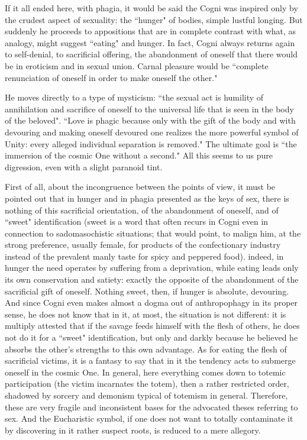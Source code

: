If it all ended here, with phagia, it would be said the Cogni was inspired only by the crudest aspect of sexuality: the
``hunger" of bodies, simple lustful longing. But suddenly he proceeds to appositions that are in complete contrast with
what, as analogy, might suggest ``eating" and hunger. In fact, Cogni always returns again to self-denial, to sacrificial
offering, the abandonment of oneself that there would be in eroticism and in sexual union. Carnal pleasure would be
``complete renunciation of oneself in order to make oneself the other."

He moves directly to a type of mysticism: ``the sexual act is humility of annihilation and sacrifice of oneself to the
universal life that is seen in the body of the beloved". ``Love is phagic because only with the gift of the body and
with devouring and making oneself devoured one realizes the more powerful symbol of Unity: every alleged individual
separation is removed." The ultimate goal is ``the immersion of the cosmic One without a second." All this seems to us
pure digression, even with a slight paranoid tint.

First of all, about the incongruence between the points of view, it must be pointed out that in hunger and in phagia
presented as the keys of sex, there is nothing of this sacrificial orientation, of the abandonment of oneself, and of
``sweet" identification (sweet is a word that often recurs in Cogni even in connection to sadomasochistic situations;
that would point, to malign him, at the strong preference, usually female, for products of the confectionary industry
instead of the prevalent manly taste for spicy and peppered food). indeed, in hunger the need operates by suffering
from a deprivation, while eating leads only its own conservation and satiety: exactly the opposite of the abandonment
of the sacrificial gift of oneself. Nothing sweet, then, if hunger is absolute, devouring. And since Cogni even makes
almost a dogma out of anthropophagy in its proper sense, he does not know that in it, at most, the situation is not
different: it is multiply attested that if the savage feeds himself with the flesh of others, he does not do it for a
``sweet" identification, but only and darkly because he believed he absorbs the other's strengths
to this own advantage. As for eating the flesh of sacrificial victims, it is a fantasy to say that in it the tendency
acts to submerge oneself in the cosmic One. In general, here everything comes down to totemic participation (the victim
incarnates the totem), then a rather restricted order, shadowed by sorcery and demonism typical of totemism in general.
Therefore, these are very fragile and inconsistent bases for the advocated theses referring to sex. And the Eucharistic
symbol, if one does not want to totally contaminate it by discovering in it rather suspect roots, is reduced to a mere
allegory.

